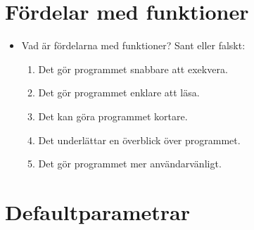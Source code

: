 \mode*

\section{Fördelar med funktioner}

\begin{frame}[fragile]
  \begin{question}
    \begin{itemize}
      \item Vad är fördelarna med funktioner? Sant eller falskt:
        \begin{enumerate}
          \item<+> Det gör programmet snabbare att exekvera.
          \item<+> Det gör programmet enklare att läsa.
          \item<+> Det kan göra programmet kortare.
          \item<+> Det underlättar en överblick över programmet.
          \item<+> Det gör programmet mer användarvänligt.
        \end{enumerate}
    \end{itemize}
  \end{question}
\end{frame}


\section{Defaultparametrar}

\begin{frame}[fragile]
  \begin{example}
    \inputminted{python}{examples/hello.py}
  \end{example}
\end{frame}

\begin{frame}[fragile]
  \begin{example}
    \inputminted[firstline=7,lastline=15]{python}{examples/area.py}
  \end{example}
\end{frame}

